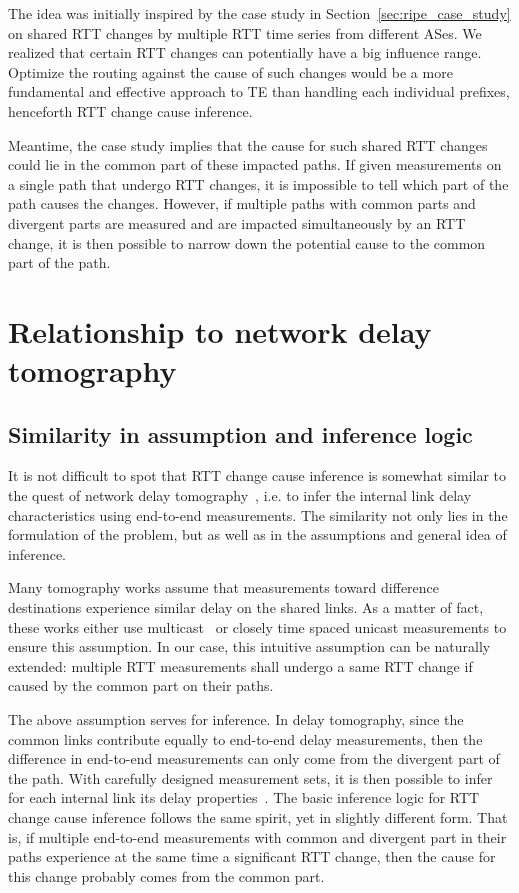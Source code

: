 The idea was initially inspired by the case study in Section~\ref{sec:ripe_case_study} on shared RTT changes by multiple RTT time series from different ASes. 
We realized that certain RTT changes can potentially have a big influence range.
Optimize the routing against the cause of such changes would be a more fundamental and effective approach to TE than handling each individual prefixes, henceforth RTT change cause inference.

Meantime, the case study implies that the cause for such shared RTT changes could lie in the common part of these impacted paths.
If given measurements on a single path that undergo RTT changes, it is impossible to tell which part of the path causes the changes. However, if multiple paths with common parts and divergent parts are measured and are impacted simultaneously by an RTT change, it is then possible to narrow down the potential cause to the common part of the path.

\section{Relationship to network delay tomography}

\subsection{Similarity in assumption and inference logic}
It is not difficult to spot that RTT change cause inference is somewhat similar to the quest of network delay tomography~\cite{Coates2002}, i.e. to infer the internal link delay characteristics using end-to-end measurements. The similarity not only lies in the formulation of the problem, but as well as in the assumptions and general idea of inference.

Many tomography works assume that measurements toward difference destinations experience similar delay on the shared links. As a matter of fact, these works either use multicast~\cite{LoPresti2002} or closely time spaced unicast measurements\cite{Shih2003,Tsang2003} to ensure this assumption. In our case, this intuitive assumption can be naturally extended: multiple RTT measurements shall undergo a same RTT change if caused by the common part on their paths.

The above assumption serves for inference. In delay tomography, since the common links contribute equally to end-to-end delay measurements, then the difference in end-to-end measurements can only come from the divergent part of the path. With carefully designed measurement sets, it is then possible to infer for each internal link its delay properties~\cite{Lawrence2006}.
The basic inference logic for RTT change cause inference follows the same spirit, yet in slightly different form. That is, if multiple end-to-end measurements with common and divergent part in their paths experience at the same time a significant RTT change, then the cause for this change probably comes from the common part.

